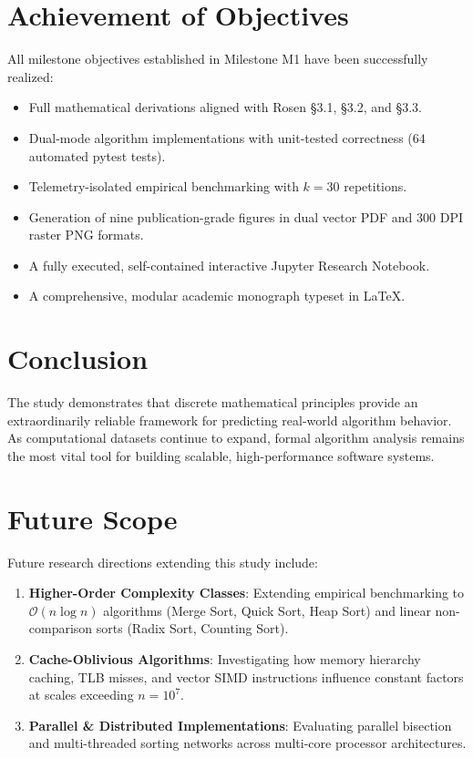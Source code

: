 \documentclass[11pt,a4paper,oneside]{report}
\theoremstyle{definition}
\begin{document}
\section{Achievement of Objectives}
All milestone objectives established in Milestone M1 have been successfully realized:
\begin{itemize}
    \item Full mathematical derivations aligned with Rosen §3.1, §3.2, and §3.3.
    \item Dual-mode algorithm implementations with unit-tested correctness ($64$ automated pytest tests).
    \item Telemetry-isolated empirical benchmarking with $k = 30$ repetitions.
    \item Generation of nine publication-grade figures in dual vector PDF and 300 DPI raster PNG formats.
    \item A fully executed, self-contained interactive Jupyter Research Notebook.
    \item A comprehensive, modular academic monograph typeset in LaTeX.
\end{itemize}

\section{Conclusion}
The study demonstrates that discrete mathematical principles provide an extraordinarily reliable framework for predicting real-world algorithm behavior. As computational datasets continue to expand, formal algorithm analysis remains the most vital tool for building scalable, high-performance software systems.

\section{Future Scope}
Future research directions extending this study include:
\begin{enumerate}
    \item \textbf{Higher-Order Complexity Classes}: Extending empirical benchmarking to $\mathcal{O}(n \log n)$ algorithms (Merge Sort, Quick Sort, Heap Sort) and linear non-comparison sorts (Radix Sort, Counting Sort).
    \item \textbf{Cache-Oblivious Algorithms}: Investigating how memory hierarchy caching, TLB misses, and vector SIMD instructions influence constant factors at scales exceeding $n = 10^7$.
    \item \textbf{Parallel & Distributed Implementations}: Evaluating parallel bisection and multi-threaded sorting networks across multi-core processor architectures.
\end{enumerate}
\end{document}
